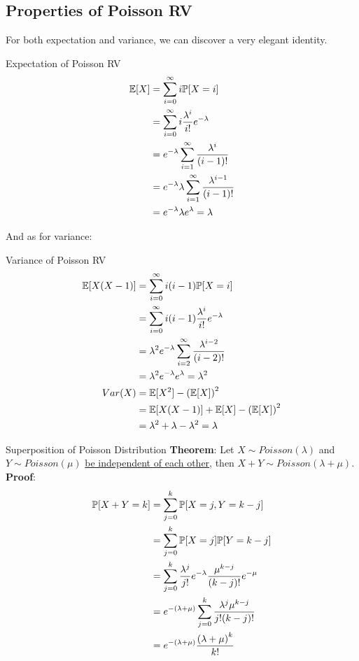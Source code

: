 \subsection{Properties of Poisson RV}
For both expectation and variance, we can discover a very elegant identity. \\
\begin{ln-theorem}{Expectation of Poisson RV}{}
    \begin{align*}
        \E[X]
        &= \sum_{i = 0}^\infty i \P[X = i] \\
        &= \sum_{i = 0}^\infty i \frac{\lambda^i}{i!} e^{-\lambda} \\
        &= e^{-\lambda} \sum_{i = 1}^\infty \frac{\lambda^i}{(i - 1)!} \\
        &= e^{-\lambda} \lambda \sum_{i = 1}^\infty \frac{\lambda^{i - 1}}{(i - 1)!} \\
        &= e^{-\lambda} \lambda e^{\lambda} = \lambda
    \end{align*}
\end{ln-theorem}
And as for variance:
\begin{ln-theorem}{Variance of Poisson RV}{}
    \begin{align*}
        \E[X(X - 1)]
        &= \sum_{i = 0}^\infty i(i - 1) \P[X = i] \\
        &= \sum_{i = 0}^\infty i(i - 1) \frac{\lambda^i}{i!} e^{-\lambda} \\
        &= \lambda^2 e^{-\lambda} \sum_{i = 2}^\infty \frac{\lambda^{i - 2}}{(i - 2)!} \\
        &= \lambda^2 e^{-\lambda} e^{\lambda} = \lambda^2 \\
        Var(X) &= \E[X^2] - {(\E[X])}^2 \\
        &= \E[X(X - 1)] + \E[X] - {(\E[X])}^2 \\
        &= \lambda^2 + \lambda - \lambda^2 = \lambda
    \end{align*}
\end{ln-theorem}

\begin{ln-theorem}{Superposition of Poisson Distribution}{}
    \textbf{Theorem}: Let $X \sim Poisson(\lambda)$ and $Y \sim Poisson(\mu)$ \underline{be independent of each other}, then $X + Y \sim Poisson(\lambda + \mu)$.
    \tcblower
    \textbf{Proof}:
    \begin{align*}
        \P[X + Y = k]
        &= \sum_{j = 0}^k \P[X = j, Y = k - j] \\
        &= \sum_{j = 0}^k \P[X = j] \P[Y = k - j] \\
        &= \sum_{j = 0}^k \frac{\lambda^j}{j!} e^{-\lambda} \frac{\mu^{k - j}}{(k - j)!} e^{-\mu} \\
        &= e^{-(\lambda + \mu)} \sum_{j = 0}^k \frac{\lambda^j \mu^{k - j}}{j!(k - j)!} \\
        &= e^{-(\lambda + \mu)} \frac{{(\lambda + \mu)}^k}{k!}
    \end{align*}
\end{ln-theorem}

